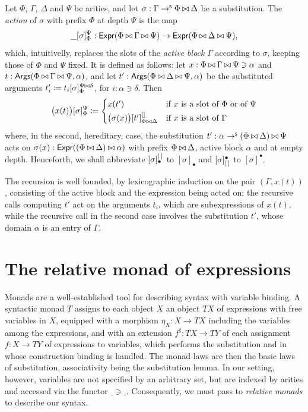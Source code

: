 \begin{definition}\label{def:action}
    Let $\Phi$, $\Gamma$, $\Delta$ and $\Psi$ be arities, and let $\sigma : \Gamma \to^{\mathsf{s}} \Phi \mathbin{\bowtie} \Delta$ be a substitution. The \emph{action} of $\sigma$ with prefix $\Phi$ at depth $\Psi$ is the map
    \[
    \_[\sigma]_\Phi^\Psi : \mathsf{Expr}(\Phi \mathbin{\bowtie} \Gamma \mathbin{\bowtie} \Psi) \to \mathsf{Expr}(\Phi \mathbin{\bowtie} \Delta \mathbin{\bowtie} \Psi),
    \]
    which, intuitivelly, replaces the slots of the \emph{active block} $\Gamma$ according to $\sigma$, keeping those of $\Phi$ and $\Psi$ fixed. It is defined as follows: let $x : \Phi \mathbin{\bowtie} \Gamma \mathbin{\bowtie} \Psi \ni \alpha$ and $t : \mathsf{Args}(\Phi \mathbin{\bowtie} \Gamma \mathbin{\bowtie} \Psi, \alpha)$, and let $t' : \mathsf{Args}(\Phi \mathbin{\bowtie} \Delta \mathbin{\bowtie} \Psi, \alpha)$ be the substituted arguments $t'_i \coloneqq t_i[\sigma]_\Phi^{\Psi \mathbin{\bowtie} \delta}$, for $i : \alpha \ni \delta$. Then
    \[
    \big(x(t)\big)[\sigma]_\Phi^\Psi \coloneqq
    \begin{cases}
        x(t') & \text{if $x$ is a slot of $\Phi$ or of $\Psi$}\\[2pt]
        \big(\sigma(x)\big)[t']_{\Phi\mathbin{\bowtie}\Delta}^{[]} & \text{if $x$ is a slot of $\Gamma$}
    \end{cases}
    \]
    where, in the second, hereditary, case, the substitution $t' : \alpha \to^{\mathsf{s}} (\Phi \mathbin{\bowtie} \Delta) \mathbin{\bowtie} \Psi$ acts on $\sigma(x) : \mathsf{Expr}((\Phi \mathbin{\bowtie} \Delta) \mathbin{\bowtie} \alpha)$ with prefix $\Phi \mathbin{\bowtie} \Delta$, active block $\alpha$ and at empty depth. Henceforth, we shall abbreviate $[\sigma]_\bullet^{\left[\,\right]}$ to $[\sigma]_\bullet$ and $[\sigma]^\bullet_{\left[\,\right]}$ to $[\sigma]^\bullet$.

    The recursion is well founded, by lexicographic induction on the pair $(\Gamma, x(t))$, consisting of the active block and the expression being acted on: the recursive calls computing $t'$ act on the arguments $t_i$, which are subexpressions of $x(t)$, while the recursive call in the second case involves the substitution $t'$, whose domain $\alpha$ is an entry of $\Gamma$.
\end{definition}

\section{The relative monad of expressions}

Monads are a well-established tool for describing syntax with variable binding. A syntactic monad $T$ assigns to each object $X$ an object $TX$ of expressions with free variables in $X$, equipped with a morphism $\eta_X : X \to TX$ including the variables among the expressions, and with an extension $f^\sharp : TX \to TY$ of each assignment $f : X \to TY$ of expressions to variables, which performs the substitution and in whose construction binding is handled. The monad laws are then the basic laws of substitution, associativity being the substitution lemma. In our setting, however, variables are not specified by an arbitrary set, but are indexed by arities and accessed via the functor $\_\ni\_$. Consequently, we must pass to \emph{relative monads} \cite{AltenkirchChapmanUustalu2015} to describe our syntax.


